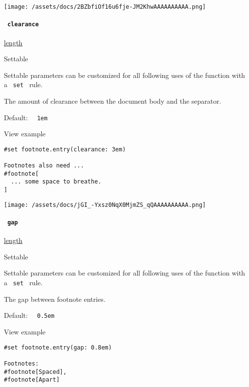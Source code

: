 \texttt{[image: /assets/docs/2BZbfiOf16u6fje-JM2KhwAAAAAAAAAA.png]}

\paragraph{\texorpdfstring{\texttt{\ clearance\ }}{ clearance }}\label{definitions-entry-clearance}

\href{/docs/reference/layout/length/}{length}

{{ Settable }}

\label{definitions-entry-clearance-settable-tooltip}
Settable parameters can be customized for all following uses of the
function with a \texttt{\ set\ } rule.

The amount of clearance between the document body and the separator.

Default: \texttt{\ }{\texttt{\ 1em\ }}\texttt{\ }


View example

\begin{verbatim}
#set footnote.entry(clearance: 3em)

Footnotes also need ...
#footnote[
  ... some space to breathe.
]
\end{verbatim}

\texttt{[image: /assets/docs/jGI\_-Yxsz0NqX0MjmZS\_qQAAAAAAAAAA.png]}

\paragraph{\texorpdfstring{\texttt{\ gap\ }}{ gap }}\label{definitions-entry-gap}

\href{/docs/reference/layout/length/}{length}

{{ Settable }}

\label{definitions-entry-gap-settable-tooltip}
Settable parameters can be customized for all following uses of the
function with a \texttt{\ set\ } rule.

The gap between footnote entries.

Default: \texttt{\ }{\texttt{\ 0.5em\ }}\texttt{\ }


View example

\begin{verbatim}
#set footnote.entry(gap: 0.8em)

Footnotes:
#footnote[Spaced],
#footnote[Apart]
\end{verbatim}

